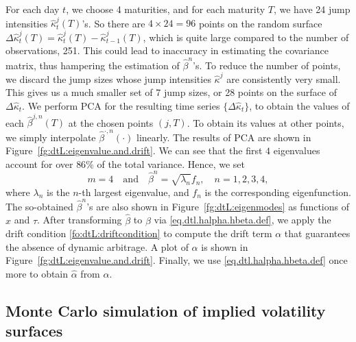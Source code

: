 \documentclass{article}
\numberwithin{equation}{section}
\def\halpha{\hat{\alpha}}
\def\hbeta{\hat{\beta}}
\begin{document}
For each day $t$, we choose 4 maturities, and for each maturity $T$, we have 24 jump intensities $\hat{\kappa}^j_t(T)$'s. So there are $4\times 24 = 96$ points on the random surface $\Delta \hat{\kappa}^j_t(T) = \hat{\kappa}^{j}_{t}(T) - \hat{\kappa}^{j}_{t-1}(T)$, which is quite large compared to the number of observations, 251. This could lead to inaccuracy in estimating the covariance matrix, thus hampering the estimation of $\hat{\beta}^n$'s. To reduce the number of points, we discard the jump sizes whose jump intensities $\hat{\kappa}^j$ are consistently very small. This gives us a much smaller set of 7 jump sizes, or 28 points on the surface of $\Delta\hat{\kappa}_t$. We perform PCA for the resulting time series $\{\Delta\hat{\kappa}_t\}$, to obtain the values of each $\hbeta^{j,n}(T)$ at the chosen points $(j,T)$. To obtain its values at other points, we simply interpolate $\hbeta^{\cdot,n}(\cdot)$ linearly.
The results of PCA are shown in Figure~\ref{fg:dtL:eigenvalue.and.drift}. We can see that the first $4$ eigenvalues account for over $86\%$ of the total variance. Hence, we set
\begin{equation*}
m = 4  \quad \text{and} \quad \hat{\beta}^n =  \sqrt{\lambda_n} f_n, \quad n = 1,2,3,4,
\end{equation*}
where $\lambda_n$ is the $n$-th largest eigenvalue, and $f_n$ is the corresponding eigenfunction.   
The so-obtained $\hat{\beta}^n$'s are also shown in Figure~\ref{fg:dtL:eigenmodes} as functions of $x$ and $\tau$. After transforming $\hbeta$ to $\beta$ via \eqref{eq.dtl.halpha.hbeta.def}, we apply the drift condition \eqref{fo:dtL:driftcondition} to compute the drift term $\alpha$ that guarantees the absence of dynamic arbitrage. A plot of $\alpha$ is shown in Figure~\ref{fg:dtL:eigenvalue.and.drift}. Finally, we use \eqref{eq.dtl.halpha.hbeta.def} once more to obtain $\halpha$ from $\alpha$.








\subsection{Monte Carlo simulation of implied volatility surfaces}\label{sec:dtL:simulation}
\end{document}
